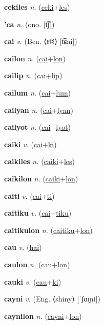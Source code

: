\textbf{\hypertarget{cekiles}{cekiles}} \textit{n.} (\hyperlink{ceki}{ceki}+\allowbreak \hyperlink{les}{les})


\textbf{\hypertarget{'ca}{'ca}} \textit{n.} (ono. [t͡ʃ])


\textbf{\hypertarget{cai}{cai}} \textit{v.} (Ben. ⟨{\bengali{}চাই}⟩ [t͡ɕai])


\textbf{\hypertarget{cailon}{cailon}} \textit{n.} (\hyperlink{cai}{cai}+\allowbreak \hyperlink{lon}{lon})


\textbf{\hypertarget{cailip}{cailip}} \textit{n.} (\hyperlink{cai}{cai}+\allowbreak \hyperlink{lip}{lip})


\textbf{\hypertarget{cailum}{cailum}} \textit{n.} (\hyperlink{cai}{cai}+\allowbreak \hyperlink{lum}{lum})


\textbf{\hypertarget{cailyan}{cailyan}} \textit{n.} (\hyperlink{cai}{cai}+\allowbreak \hyperlink{lyan}{lyan})


\textbf{\hypertarget{cailyot}{cailyot}} \textit{n.} (\hyperlink{cai}{cai}+\allowbreak \hyperlink{lyot}{lyot})


\textbf{\hypertarget{caiki}{caiki}} \textit{v.} (\hyperlink{cai}{cai}+\allowbreak \hyperlink{ki}{ki})


\textbf{\hypertarget{caikiles}{caikiles}} \textit{n.} (\hyperlink{caiki}{caiki}+\allowbreak \hyperlink{les}{les})


\textbf{\hypertarget{caikilon}{caikilon}} \textit{n.} (\hyperlink{caiki}{caiki}+\allowbreak \hyperlink{lon}{lon})


\textbf{\hypertarget{caiti}{caiti}} \textit{v.} (\hyperlink{cai}{cai}+\allowbreak \hyperlink{ti}{ti})


\textbf{\hypertarget{caitiku}{caitiku}} \textit{v.} (\hyperlink{cai}{cai}+\allowbreak \hyperlink{tiku}{tiku})


\textbf{\hypertarget{caitikulon}{caitikulon}} \textit{n.} (\hyperlink{caitiku}{caitiku}+\allowbreak \hyperlink{lon}{lon})


\textbf{\hypertarget{cau}{cau}} \textit{v.} (\hyperlink{hai}{\sout{hai}})


\textbf{\hypertarget{caulon}{caulon}} \textit{n.} (\hyperlink{cau}{cau}+\allowbreak \hyperlink{lon}{lon})


\textbf{\hypertarget{cauki}{cauki}} \textit{v.} (\hyperlink{cau}{cau}+\allowbreak \hyperlink{ki}{ki})


\textbf{\hypertarget{cayni}{cayni}} \textit{v.} (Eng. ⟨shiny⟩ [ˈʃɑɪ̯ni])


\textbf{\hypertarget{caynilon}{caynilon}} \textit{n.} (\hyperlink{cayni}{cayni}+\allowbreak \hyperlink{lon}{lon})


